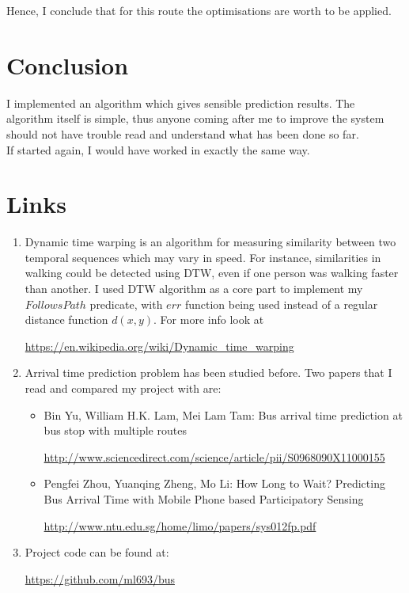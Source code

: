 \documentclass[12pt,a4paper,oneside,openright]{report}
\begin{document}
Hence, I conclude that for this route the optimisations are worth to be applied.

\chapter{Conclusion}

I implemented an algorithm which gives sensible prediction results. The
algorithm itself is simple, thus anyone coming after me to improve the
system should not have trouble read and understand what has been done so far. \\

If started again, I would have worked in exactly the same way.




\appendix

\chapter{Links}

\begin{enumerate}
\item Dynamic time warping is an algorithm for measuring similarity between
two temporal sequences which may vary in speed. For instance, similarities in
walking could be detected using DTW, even if one person was walking faster than
another. I used DTW algorithm as a core part to implement my $FollowsPath$
predicate, with $err$ function being used instead of a regular distance function 
$d(x, y)$.
For more info look at

\textcolor{blue}{\url{https://en.wikipedia.org/wiki/Dynamic_time_warping}}

\item Arrival time prediction problem has been studied before. Two papers that
I read and compared my project with are:

\begin{itemize}

\item Bin Yu, William H.K. Lam, Mei Lam Tam: Bus arrival time prediction at
bus stop with multiple routes 

\textcolor{blue}{\url{http://www.sciencedirect.com/science/article/pii/S0968090X11000155}}

\item Pengfei Zhou, Yuanqing Zheng, Mo Li: How Long to Wait? Predicting Bus Arrival Time with Mobile Phone based Participatory Sensing

\textcolor{blue}{\url{http://www.ntu.edu.sg/home/limo/papers/sys012fp.pdf}}

\end{itemize}

\item Project code can be found at: 

\textcolor{blue}{\url{https://github.com/ml693/bus}}


\end{enumerate}
\end{document}
